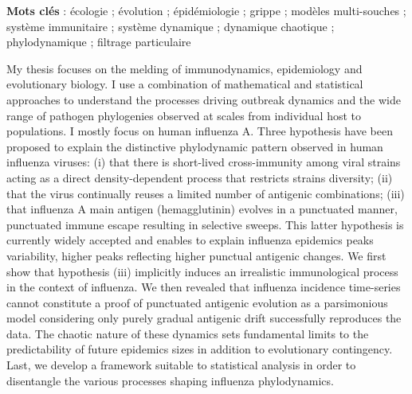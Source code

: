 \documentclass[12pt]{report}
\begin{document}
\vspace{2cm}

{\noindent
\textbf{Mots clés} : écologie ; évolution ; épidémiologie ; grippe ;
modèles multi-souches ; système immunitaire ; système dynamique ;
dynamique chaotique ; phylodynamique ; filtrage particulaire
}


\clearpage

My thesis focuses on the melding of immunodynamics, epidemiology and
evolutionary biology. I use a combination of mathematical and
statistical approaches to understand the processes driving outbreak
dynamics and the wide range of pathogen phylogenies observed at scales
from individual host to populations. I mostly focus on human influenza
A. Three hypothesis have been proposed to explain the distinctive
phylodynamic pattern observed in human influenza viruses: (i) that
there is short-lived cross-immunity among viral strains acting as a
direct density-dependent process that restricts strains diversity;
(ii) that the virus continually reuses a limited number of antigenic
combinations; (iii) that influenza A main antigen (hemagglutinin)
evolves in a punctuated manner, punctuated immune escape resulting in
selective sweeps. This latter hypothesis is currently widely accepted
and enables to explain influenza epidemics peaks variability, higher
peaks reflecting higher punctual antigenic changes. We first show that
hypothesis (iii) implicitly induces an irrealistic immunological
process in the context of influenza. We then revealed that influenza
incidence time-series cannot constitute a proof of punctuated
antigenic evolution as a parsimonious model considering only purely
gradual antigenic drift successfully reproduces the data. The chaotic
nature of these dynamics sets fundamental limits to the predictability
of future epidemics sizes in addition to evolutionary
contingency. Last, we develop a framework suitable to statistical
analysis in order to disentangle the various processes shaping
influenza phylodynamics.






\cleardoublepage
%

\tableofcontents


\end{document}
